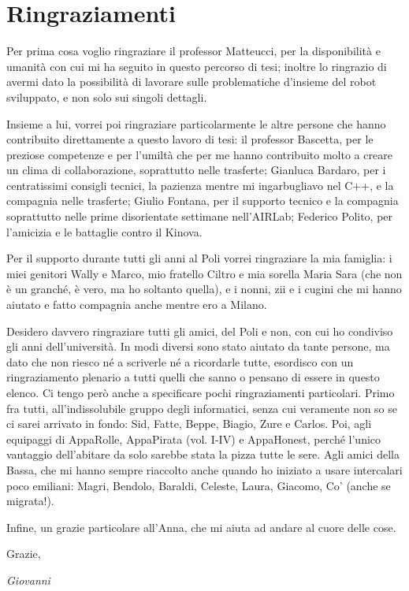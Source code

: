 
\bigskip

\begingroup
\let\clearpage\relax
\let\cleardoublepage\relax
\let\cleardoublepage\relax
\chapter*{Ringraziamenti}
Per prima cosa voglio ringraziare il professor Matteucci, per la disponibilità e umanità con cui mi ha seguito in questo percorso di tesi; inoltre lo ringrazio di avermi dato la possibilità di lavorare sulle problematiche d'insieme del robot sviluppato, e non solo sui singoli dettagli.
\par Insieme a lui, vorrei poi ringraziare particolarmente le altre persone che hanno contribuito direttamente a questo lavoro di tesi: il professor Bascetta, per le preziose competenze e per l'umiltà che per me hanno contribuito molto a creare un clima di collaborazione, soprattutto nelle trasferte; Gianluca Bardaro, per i centratissimi consigli tecnici, la pazienza mentre mi ingarbugliavo nel C++, e la compagnia nelle trasferte; Giulio Fontana, per il supporto tecnico e la compagnia soprattutto nelle prime disorientate settimane nell'AIRLab; Federico Polito, per l'amicizia e le battaglie contro il Kinova.
\par Per il supporto durante tutti gli anni al Poli vorrei ringraziare la mia famiglia: i miei genitori Wally e Marco, mio fratello Ciltro e mia sorella Maria Sara (che non è un granché, è vero, ma ho soltanto quella), e i nonni, zii e i cugini che mi hanno aiutato e fatto compagnia anche mentre ero a Milano. 
\par Desidero davvero ringraziare tutti gli amici, del Poli e non, con cui ho condiviso gli anni dell'università. In modi diversi sono stato aiutato da tante persone, ma dato che non riesco né a scriverle né a ricordarle tutte, esordisco con un ringraziamento plenario a tutti quelli che sanno o pensano di essere in questo elenco. Ci tengo però anche a specificare pochi ringraziamenti particolari. Primo fra tutti, all'indissolubile gruppo degli informatici, senza cui veramente non so se ci sarei arrivato in fondo: Sid, Fatte, Beppe, Biagio, Zure e Carlos.
Poi, agli equipaggi di AppaRolle, AppaPirata (vol. I-IV) e AppaHonest, perché l'unico vantaggio dell'abitare da solo sarebbe stata la pizza tutte le sere. Agli amici della Bassa, che mi hanno sempre riaccolto anche quando ho iniziato a usare intercalari poco emiliani: Magri, Bendolo, Baraldi, Celeste, Laura, Giacomo, Co' (anche se migrata!).
\par Infine, un grazie particolare all'Anna, che mi aiuta ad andare al cuore delle cose.
\par Grazie,
\begin{flushright}
\textit{Giovanni}
\end{flushright}


\endgroup